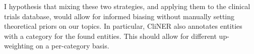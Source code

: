 \documentclass{article}
\begin{document}
\begin{multicols}{2}
I hypothesis that mixing these two strategies, and applying them to the clinical trials database, would allow for informed biasing without manually setting theoretical priors on our topics. In particular, CliNER also annotates entities with a category for the found entities. This should allow for different up-weighting on a per-category basis.


\begin{comment}
\section{Objectives}


\section{Approach}


\section{Dragons}


\section{Evaluation}


\section{Schedule}


\end{comment}
\end{multicols}
\end{document}
